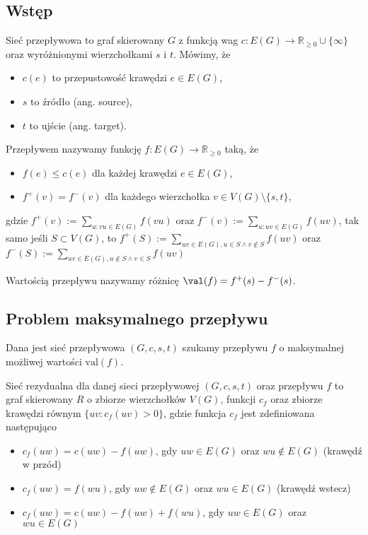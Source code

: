 \subsection{Wstęp}
\begin{defi}
	Sieć przepływowa to graf skierowany $G$
	z funkcją wag $c: E(G) \to 
	\mathbb{R}_{\geq 0} \cup \{\infty\}$ oraz
	wyróżnionymi wierzchołkami $s$ i $t$. Mówimy, że
	\begin{itemize}[noitemsep, nolistsep]
		\item $c(e)$ to przepustowość krawędzi $e \in E(G)$,
		\item $s$ to źródło (ang. source),
		\item $t$ to ujście (ang. target).
	\end{itemize}
\end{defi}

\begin{defi}
	Przepływem nazywamy funkcję $f: E(G) \to \mathbb{R}_{\geq 0}$ 
	taką, że 
	\begin{itemize}
		\item $f(e) \leq c(e)$ dla każdej krawędzi $e\in E(G)$,
		\item $f^+(v) = f^-(v)$ dla każdego wierzchołka $v \in V(G) \setminus \{s, t\}$,
	\end{itemize}
	gdzie $f^+(v) := \sum\limits_{u:vu \in E(G)} f(vu)$ oraz $f^-(v) := \sum\limits_{u:uv \in E(G)} f(uv)$,
	tak samo jeśli $S \subset V(G)$, to $f^+(S) := \sum\limits_{uv \in E(G), u\in S \land v \not \in S  } f(uv)$ oraz 
	$f^-(S) := \sum\limits_{uv \in E(G), u\not \in S \land v \in S  } f(uv)$
\end{defi}

\begin{defi}
	Wartością przepływu nazywamy różnicę 
	$\val(f)=f^+(s)-f^-(s)$.
\end{defi}

\subsection{Problem maksymalnego przepływu}
Dana jest sieć przepływowa $(G, c, s, t)$ szukamy przepływu $f$
o maksymalnej możliwej wartości $\text{val}(f)$. 

\begin{defi}
	Sieć rezydualna dla danej sieci przepływowej $(G, c, s, t)$
	oraz przepływu $f$ to graf skierowany $R$ o zbiorze
	wierzchołków $V(G)$, funkcji $c_f$ oraz zbiorze krawędzi
	równym $\{uv : c_f(uv) > 0\}$, gdzie funkcja $c_f$ jest 
	zdefiniowana następująco
	\begin{itemize}
		\item $c_f(uw) = c(uw) - f(uw)$, gdy $uw \in E(G)$ oraz $wu \not \in E(G)$ (krawędź w przód)
		\item $c_f(uw) = f(wu)$, gdy $uw \not \in E(G)$ oraz $wu \in E(G)$ (krawędź wstecz)
		\item $c_f(uw) = c(uw) - f(uw) + f(wu)$, gdy 
		$uw \in E(G)$ oraz $wu \in E(G)$
	\end{itemize}
\end{defi}

